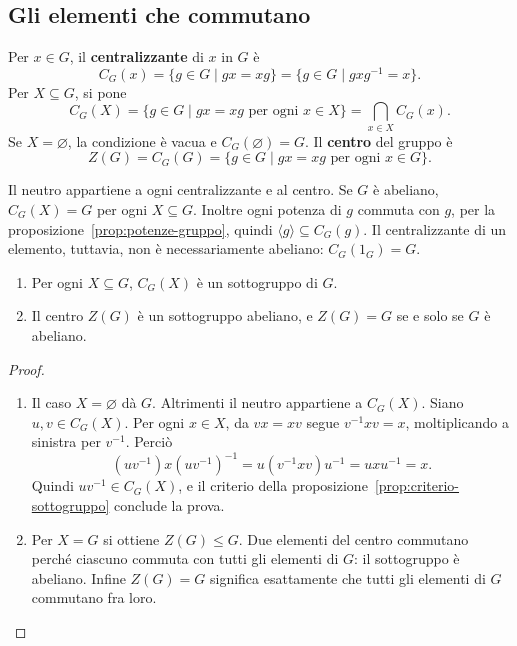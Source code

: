 \subsection{Gli elementi che commutano}
\begin{definizione}
Per $x\in G$, il \textbf{centralizzante} di $x$ in $G$ è
\[
C_G(x)=\{g\in G\mid gx=xg\}=\{g\in G\mid gxg^{-1}=x\}.
\]
Per $X\subseteq G$, si pone
\[
C_G(X)=\{g\in G\mid gx=xg\text{ per ogni }x\in X\}
      =\bigcap_{x\in X}C_G(x).
\]
Se $X=\varnothing$, la condizione è vacua e $C_G(\varnothing)=G$. Il \textbf{centro} del gruppo è
\[
Z(G)=C_G(G)=\{g\in G\mid gx=xg\text{ per ogni }x\in G\}.
\]
\end{definizione}

Il neutro appartiene a ogni centralizzante e al centro. Se $G$ è abeliano, $C_G(X)=G$ per ogni $X\subseteq G$. Inoltre ogni potenza di $g$ commuta con $g$, per la proposizione~\ref{prop:potenze-gruppo}, quindi $\langle g\rangle\subseteq C_G(g)$. Il centralizzante di un elemento, tuttavia, non è necessariamente abeliano: $C_G(1_G)=G$.

\begin{proposizione}\label{prop:centralizzante-sottogruppo}
\begin{enumerate}[label=\arabic*.]
\item Per ogni $X\subseteq G$, $C_G(X)$ è un sottogruppo di $G$.
\item Il centro $Z(G)$ è un sottogruppo abeliano, e $Z(G)=G$ se e solo se $G$ è abeliano.
\end{enumerate}
\end{proposizione}
\begin{proof}
\begin{enumerate}[label=\arabic*.]
\item Il caso $X=\varnothing$ dà $G$. Altrimenti il neutro appartiene a $C_G(X)$. Siano $u,v\in C_G(X)$. Per ogni $x\in X$, da $vx=xv$ segue $v^{-1}xv=x$, moltiplicando a sinistra per $v^{-1}$. Perciò
\[
(uv^{-1})x(uv^{-1})^{-1}
 =u(v^{-1}xv)u^{-1}=uxu^{-1}=x.
\]
Quindi $uv^{-1}\in C_G(X)$, e il criterio della proposizione~\ref{prop:criterio-sottogruppo} conclude la prova.
\item Per $X=G$ si ottiene $Z(G)\le G$. Due elementi del centro commutano perché ciascuno commuta con tutti gli elementi di $G$: il sottogruppo è abeliano. Infine $Z(G)=G$ significa esattamente che tutti gli elementi di $G$ commutano fra loro.
\end{enumerate}
\end{proof}

